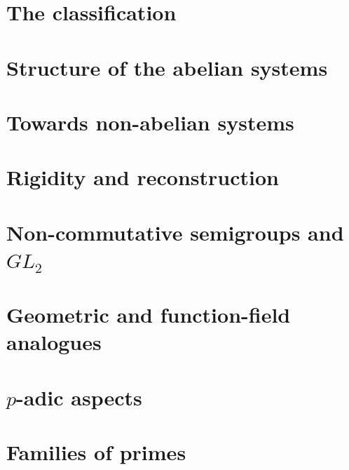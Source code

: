 \part{The classification}

\part{Structure of the abelian systems}













\part{Towards non-abelian systems}





\part{Rigidity and reconstruction}





\part{Non-commutative semigroups and $GL_2$}





\part{Geometric and function-field analogues}





\part{$p$-adic aspects}


\part{Families of primes}



